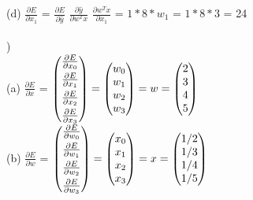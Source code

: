 \documentclass[12pt]{article}
\begin{document}
\indent (d) {\Large $\frac{\partial E}{\partial x_1}$} = {\Large $\frac{\partial E}{\partial \hat y}$} {\Large $\frac{\partial \hat y}{\partial w^Tx}$} {\Large $\frac{\partial w^Tx}{\partial x_1}$} = $1 * 8 * w_1$ = $1 * 8 * 3$ = 24\\[.4em]



\noindent \hrulefill \\



) \\
\indent (a) {\Large $\frac{\partial E}{\partial x}$} = $
\begin{pmatrix}
{\Large \frac{\partial E}{\partial x_0}}\\[.4em]
{\Large \frac{\partial E}{\partial x_1}}\\[.4em]
{\Large \frac{\partial E}{\partial x_2}}\\[.4em]
{\Large \frac{\partial E}{\partial x_3}}
\end{pmatrix} = 
\begin{pmatrix}
w_0 \\
w_1 \\
w_2 \\
w_3 
\end{pmatrix} = w = 
\begin{pmatrix}
2 \\
3 \\
4 \\
5 
\end{pmatrix}$\\[.4em]

\indent (b) {\Large $\frac{\partial E}{\partial w}$} = $
\begin{pmatrix}
{\Large \frac{\partial E}{\partial w_0}}\\[.4em]
{\Large \frac{\partial E}{\partial w_1}}\\[.4em]
{\Large \frac{\partial E}{\partial w_2}}\\[.4em]
{\Large \frac{\partial E}{\partial w_3}}
\end{pmatrix} = 
\begin{pmatrix}
x_0 \\
x_1 \\
x_2 \\
x_3 
\end{pmatrix} = x = 
\begin{pmatrix}
1/2 \\
1/3 \\
1/4 \\
1/5 
\end{pmatrix}$\\[.4em]
\end{document}
